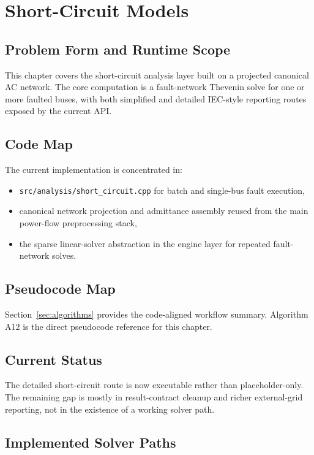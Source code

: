 \section{Short-Circuit Models}

\subsection{Problem Form and Runtime Scope}

This chapter covers the short-circuit analysis layer built on a projected
canonical AC network.  The core computation is a fault-network Thevenin solve
for one or more faulted buses, with both simplified and detailed IEC-style
reporting routes exposed by the current API.

\subsection{Code Map}

The current implementation is concentrated in:
\begin{itemize}
  \item \texttt{src/analysis/short\_circuit.cpp} for batch and single-bus fault execution,
  \item canonical network projection and admittance assembly reused from the main power-flow preprocessing stack,
  \item the sparse linear-solver abstraction in the engine layer for repeated fault-network solves.
\end{itemize}

\subsection{Pseudocode Map}

Section~\ref{sec:algorithms} provides the code-aligned workflow summary.
Algorithm A12 is the direct pseudocode reference for this chapter.

\subsection{Current Status}

The detailed short-circuit route is now executable rather than placeholder-only.
The remaining gap is mostly in result-contract cleanup and richer external-grid
reporting, not in the existence of a working solver path.

\subsection{Implemented Solver Paths}

